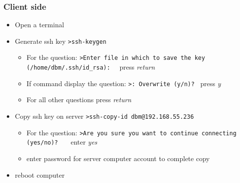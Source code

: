 \subsubsection{Client side}
\begin{itemize}
\item Open a terminal
\item Generate ssh key
	\newline
	\verb|>ssh-keygen |
	\begin{itemize}
	\item For the question:
		\newline
		\verb|>Enter file in which to save the key (/home/dbm/.ssh/id_rsa):  |
		\newline
		press \emph{return}
	\item If command display the question: 
		\newline
		\verb|>: Overwrite (y/n)? |
		\newline
		press \emph{y}
	\item For all other questions press \emph{return}
	\end{itemize}
\item Copy ssh key on server
	\newline
	\verb|>ssh-copy-id dbm@192.168.55.236|		
	\begin{itemize}
	\item For the question:
		\newline
		\verb|>Are you sure you want to continue connecting (yes/no)?   |
		\newline
		enter \emph{yes}	
	\item enter password for server computer account to complete copy
	\end{itemize}
\item reboot computer
\end{itemize}

